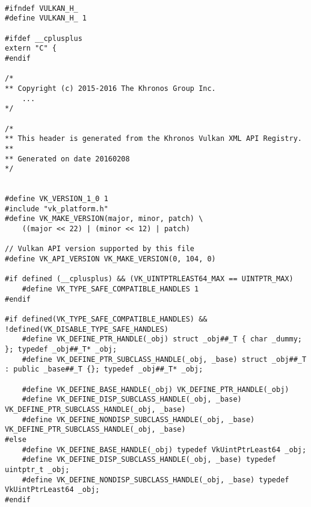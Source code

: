 \documentclass{article}
\begin{document}
\begin{verbatim}

#ifndef VULKAN_H_
#define VULKAN_H_ 1

#ifdef __cplusplus
extern "C" {
#endif

/*
** Copyright (c) 2015-2016 The Khronos Group Inc.
    ...
*/

/*
** This header is generated from the Khronos Vulkan XML API Registry.
**
** Generated on date 20160208
*/


#define VK_VERSION_1_0 1
#include "vk_platform.h"
#define VK_MAKE_VERSION(major, minor, patch) \
    ((major << 22) | (minor << 12) | patch)

// Vulkan API version supported by this file
#define VK_API_VERSION VK_MAKE_VERSION(0, 104, 0)

#if defined (__cplusplus) && (VK_UINTPTRLEAST64_MAX == UINTPTR_MAX)
    #define VK_TYPE_SAFE_COMPATIBLE_HANDLES 1
#endif

#if defined(VK_TYPE_SAFE_COMPATIBLE_HANDLES) && !defined(VK_DISABLE_TYPE_SAFE_HANDLES)
    #define VK_DEFINE_PTR_HANDLE(_obj) struct _obj##_T { char _dummy; }; typedef _obj##_T* _obj;
    #define VK_DEFINE_PTR_SUBCLASS_HANDLE(_obj, _base) struct _obj##_T : public _base##_T {}; typedef _obj##_T* _obj;

    #define VK_DEFINE_BASE_HANDLE(_obj) VK_DEFINE_PTR_HANDLE(_obj)
    #define VK_DEFINE_DISP_SUBCLASS_HANDLE(_obj, _base) VK_DEFINE_PTR_SUBCLASS_HANDLE(_obj, _base)
    #define VK_DEFINE_NONDISP_SUBCLASS_HANDLE(_obj, _base) VK_DEFINE_PTR_SUBCLASS_HANDLE(_obj, _base)
#else
    #define VK_DEFINE_BASE_HANDLE(_obj) typedef VkUintPtrLeast64 _obj;
    #define VK_DEFINE_DISP_SUBCLASS_HANDLE(_obj, _base) typedef uintptr_t _obj;
    #define VK_DEFINE_NONDISP_SUBCLASS_HANDLE(_obj, _base) typedef VkUintPtrLeast64 _obj;
#endif


\end{verbatim}
\end{document}
